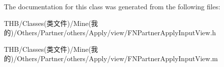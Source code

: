 The documentation for this class was generated from the following files\+:\begin{DoxyCompactItemize}
\item 
T\+H\+B/\+Classes(类文件)/\+Mine(我的)/\+Others/\+Partner/others/\+Apply/view/F\+N\+Partner\+Apply\+Input\+View.\+h\item 
T\+H\+B/\+Classes(类文件)/\+Mine(我的)/\+Others/\+Partner/others/\+Apply/view/F\+N\+Partner\+Apply\+Input\+View.\+m\end{DoxyCompactItemize}
